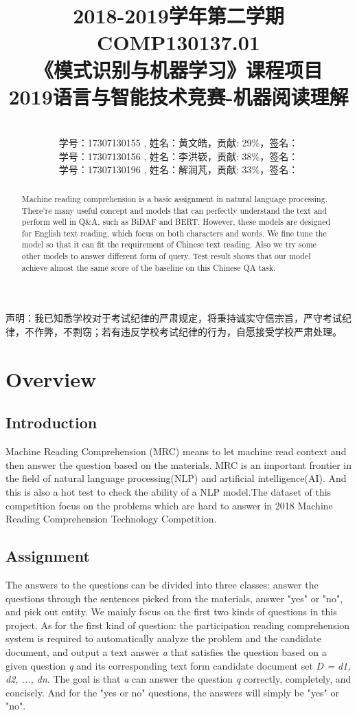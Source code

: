 \documentclass{article}
\title{2018-2019学年第二学期COMP130137.01\\
《模式识别与机器学习》课程项目\\
2019语言与智能技术竞赛-机器阅读理解}
\author{\\
学号：17307130155 , 姓名：黄文皓，贡献: 29\%，签名：\\
学号：17307130156 , 姓名：李洪嵚，贡献: 38\%，签名：\\
学号：17307130196 , 姓名：解润芃，贡献: 33\%，签名：\\}
\begin{document}
\begin{center}
  声明：我已知悉学校对于考试纪律的严肃规定，将秉持诚实守信宗旨，严守考试纪律，不作弊，不剽窃；若有违反学校考试纪律的行为，自愿接受学校严肃处理。
\end{center}
\maketitle

\begin{abstract}
   Machine reading comprehension is a basic assignment in natural language processing. There're many useful concept and models that can perfectly understand the text and perform well in Q\&A, such as BiDAF and BERT. However, these models are designed for English text reading, which focus on both characters and words. We fine tune the model so that it can fit the requirement of Chinese text reading. Also we try some other models to answer different form of query. Test result shows that our model achieve almost the same score of the baseline on this Chinese QA task.
\end{abstract}

\section{Overview}
\subsection{Introduction}
Machine Reading Comprehension (MRC) means to let machine read context and then answer the question based on the materials. MRC is an important frontier in the field of natural language processing(NLP) and artificial intelligence(AI). And this is also a hot test to check the ability of a NLP model.The dataset of this competition focus on the problems which are hard to answer in 2018 Machine Reading Comprehension Technology Competition. 

\subsection{Assignment}

The answers to the questions can be divided into three classes: answer the questions through the sentences picked from the materials, answer "yes" or "no", and pick out entity. We mainly focus on the first two kinds of questions in this project. 
As for the first kind of question: the participation reading comprehension system is required to automatically analyze the problem and the candidate document, and output a text answer \emph{a} that satisfies the question based on a given question \emph{q} and its corresponding text form candidate document set \emph{D = d1, d2, ..., dn}. The goal is that \emph{a} can answer the question \emph{q} correctly, completely, and concisely.
And for the "yes or no" questions, the answers will simply be "yes" or "no".
\end{document}
